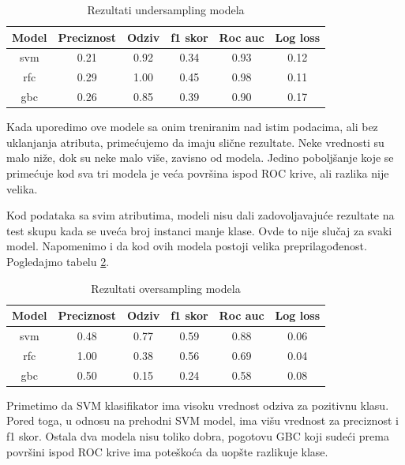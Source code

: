 \documentclass[a4paper]{article}
\begin{document}
\begin{table}[!h]
\begin{center}
\begin{tabular}{|c|c|c|c|c|c|} \hline
\textbf{Model} & \textbf{Preciznost} & \textbf{Odziv} & \textbf{f1 skor} & \textbf{Roc auc} & \textbf{Log loss} \\ \hline
svm & 0.21 & 0.92 & 0.34 & 0.93 & 0.12 \\ \hline
rfc & 0.29 & 1.00 & 0.45 & 0.98 & 0.11 \\ \hline
gbc & 0.26 & 0.85 & 0.39 & 0.90 & 0.17 \\ \hline
\end{tabular}
\caption{Rezultati undersampling modela}
\label{tab:undersampling_pg_simple}
\end{center}
\end{table}

Kada uporedimo ove modele sa onim treniranim nad istim podacima, ali bez
uklanjanja atributa, primećujemo da imaju slične rezultate. Neke vrednosti su
malo niže, dok su neke malo više, zavisno od modela. Jedino poboljšanje koje se primećuje kod sva tri modela je veća površina ispod ROC krive, ali razlika nije
velika.

Kod podataka sa svim atributima, modeli nisu dali zadovoljavajuće rezultate
na test skupu kada se uveća broj instanci manje klase. Ovde to nije slučaj za
svaki model. Napomenimo i da kod ovih modela postoji velika preprilagođenost. Pogledajmo tabelu \ref{tab:oversampling_pg_simple}.

\begin{table}[!h]
\begin{center}
\begin{tabular}{|c|c|c|c|c|c|} \hline
\textbf{Model} & \textbf{Preciznost} & \textbf{Odziv} & \textbf{f1 skor} & \textbf{Roc auc} & \textbf{Log loss} \\ \hline
svm & 0.48 & 0.77 & 0.59 & 0.88 & 0.06 \\ \hline
rfc & 1.00 & 0.38 & 0.56 & 0.69 & 0.04 \\ \hline
gbc & 0.50 & 0.15 & 0.24 & 0.58 & 0.08 \\ \hline
\end{tabular}
\caption{Rezultati oversampling modela}
\label{tab:oversampling_pg_simple}
\end{center}
\end{table}

Primetimo da SVM klasifikator ima visoku vrednost odziva za pozitivnu klasu. Pored toga, u odnosu na prehodni SVM model, ima višu vrednost za preciznost i f1 skor. Ostala dva modela nisu toliko dobra, pogotovu GBC koji sudeći prema površini ispod ROC krive ima poteškoća da uopšte razlikuje klase.
\end{document}
